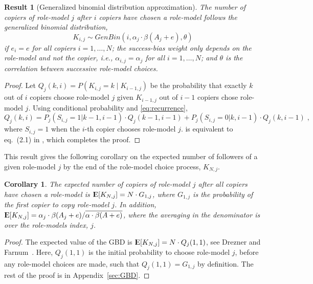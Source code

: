 \documentclass[12pt]{extarticle}
\DeclareMathOperator*{\E}{{\rm I\kern-.3em E}}
\newtheorem{corollary}{Corollary}
\newtheorem{result}{Result}
\begin{document}
\begin{result}[Generalized binomial distribution approximation]\label{res:GBD}
The number of copiers of role-model $j$ after $i$ copiers have chosen a role-model follows the generalized binomial distribution, 
$$
K_{i,j} \sim \textit{GenBin}(i,\alpha_j\cdot\beta(A_j+e),\theta)
$$
if $e_i=e$ for all copiers $i=1, \ldots, N$; the success-bias weight only depends on the role-model and not the copier, i.e., $\alpha_{i,j}=\alpha_j$  for all $i=1, \ldots, N$; and $\theta$ is the correlation between successive role-model choices.
\end{result}

\begin{proof}
{Let} $Q_j(k,i)=P(K_{i,j} = k \mid K_{i-1,j})$ {be} the probability that exactly $k$ out of $i$ copiers choose role-model $j$ given $K_{i-1,j}$ {out} of $i-1$ copiers chose role-model $j$. 
Using conditional probability and \cref{eq:recurrence},
\begin{equation}\label{recursive}
Q_j(k,i) = P_j(S_{i,j}=1 | k-1,i-1) \cdot Q_j(k-1,i-1) + P_j(S_{i,j} =0 | k,i-1) \cdot Q_j(k,i-1) \;,
\end{equation}
where $S_{i,j} =1 $ when the $i$-th copier chooses role-model $j$.
 is equivalent to eq.~(2.1) in \citep{GBD}, which completes the proof.
\end{proof}

This result gives the following corollary on the expected number of followers of a given role-model $j$ by the end of the role-model choice process, $K_{N,j}$.
\\


\begin{corollary}\label{cor:GBD} The expected number of copiers of role-model $j$ after all copiers have chosen a role-model is
$\E[K_{N,j}] = N \cdot G_{1,j}$, where $G_{1,j}$ is the probability of the first copier to copy role-model $j$.
In addition, $\E[K_{N, j}] = \alpha_j \cdot \beta(A_j+e) / \overline{\alpha \cdot \beta(A+e)}$, where the averaging in the denominator is over the role-models index, $j$.
\end{corollary}

\begin{proof}
The expected value of the GBD is
$\E[K_{N,j}] = N \cdot Q_j(1,1)$, see Drezner and Farnum~\citep[eq.~(2.3)]{GBD}.
Here, $Q_j(1,1)$ is the initial probability to choose role-model $j$, before any role-model choices are made, such that $Q_j(1,1) = G_{1,j}$ by definition.
The rest of the proof is in Appendix~\ref{sec:GBD}.
\end{proof}
\end{document}
